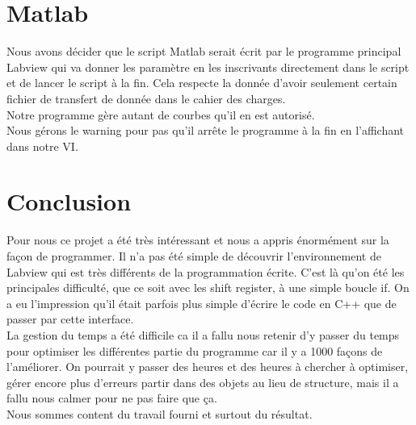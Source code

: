 \documentclass[11pt, a4paper, oneside]{article}   	%
\begin{document}
\section{Matlab}
Nous avons décider que le script Matlab serait écrit par le programme principal Labview qui va donner les paramètre en les inscrivants directement dans le script et de lancer le script à la fin. 
Cela respecte la donnée d'avoir seulement certain fichier de transfert de donnée dans le cahier des charges.\\

Notre programme gère autant de courbes qu'il en est autorisé.\\

Nous gérons le warning pour pas qu'il arrête le programme à la fin en l'affichant dans notre VI.

\section{Conclusion}

Pour nous ce projet a été très intéressant et nous a appris énormément sur la façon de programmer. Il n'a pas été simple de découvrir l'environnement de Labview qui est très différents de la programmation écrite. C'est là qu'on été les principales difficulté, que ce soit avec les shift register, à une simple boucle if. On a eu l'impression qu'il était parfois plus simple d'écrire le code en C++ que de passer par cette interface.\\

La gestion du temps a été difficile ca il a fallu nous retenir d'y passer du temps pour optimiser les différentes partie du programme car il y a 1000 façons de l'améliorer. On pourrait y passer des heures et des heures à chercher à optimiser, gérer encore plus d'erreurs partir dans des objets au lieu de structure, mais il a fallu nous calmer pour ne pas faire que ça.\\

Nous sommes content du travail fourni et surtout du résultat. 

\end{document}
